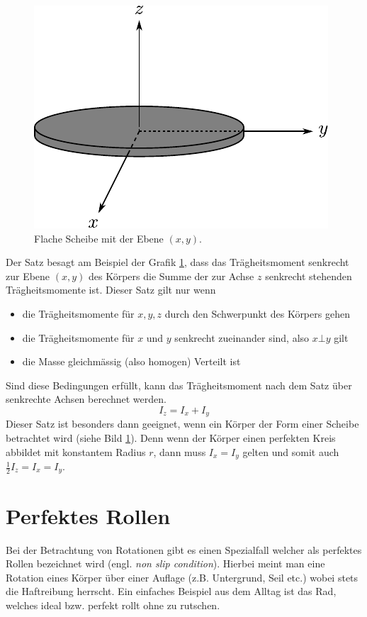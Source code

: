 \begin{figure}[h!]
	\centering
	\includegraphics[scale=0.8]{steiner2.pdf}
	\caption{Flache Scheibe mit der Ebene $(x,y)$.}
	\label{fig:steiner2}
\end{figure}

\noindent
Der Satz besagt am Beispiel der Grafik \ref{fig:steiner2}, 
dass das Trägheitsmoment senkrecht zur Ebene $(x,y)$ des 
Körpers die Summe der zur Achse $z$ senkrecht stehenden Trägheitsmomente 
ist. Dieser Satz gilt nur wenn
\begin{itemize}
	\item die Trägheitsmomente für $x,y,z$ durch den Schwerpunkt des 
		Körpers gehen
	\item die Trägheitsmomente für $x$ und $y$ senkrecht zueinander 
		sind, also $x \bot y$ gilt
	\item die Masse gleichmässig (also homogen) Verteilt ist
\end{itemize}
Sind diese Bedingungen erfüllt, kann das Trägheitsmoment nach dem Satz
über senkrechte Achsen berechnet werden.
\[ \boxed{I_z = I_x + I_y} \]
Dieser Satz ist besonders dann geeignet, wenn ein Körper der Form einer
Scheibe betrachtet wird (siehe Bild \ref{fig:steiner2}). 
Denn wenn der Körper einen perfekten Kreis abbildet mit konstantem 
Radius $r$, dann muss $I_x = I_y$ gelten und somit auch 
$\frac{1}{2} I_z = I_x = I_y$.

\newpage
\section{Perfektes Rollen}\label{sec:non-slip}
Bei der Betrachtung von Rotationen gibt es einen Spezialfall welcher
als perfektes Rollen bezeichnet wird (engl. \textit{non slip condition}).
Hierbei meint man eine Rotation eines Körper über einer Auflage (z.B. 
Untergrund, Seil etc.) wobei stets die Haftreibung herrscht. 
Ein einfaches Beispiel aus dem Alltag ist das Rad, welches ideal bzw. 
perfekt rollt ohne zu rutschen.

